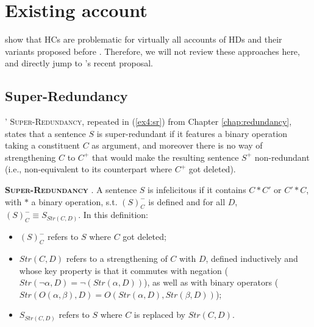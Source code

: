 \section{Existing account}\label{sec6:prev-approaches}

\textcite{Mandelkern2018} show that HCs are problematic for virtually all accounts of HDs and their variants proposed before \textcite{Kalomoiros2024}. Therefore, we will not review these approaches here, and directly jump to  \citeauthor{Kalomoiros2024}'s recent proposal.



\subsection{Super-Redundancy}
\citeauthor{Kalomoiros2024}' \textsc{Super-Redundancy}, repeated in (\ref{ex4:sr}) from Chapter \ref{chap:redundancy}, states that a sentence $S$ is super-redundant if it features a binary operation taking a constituent $C$ as argument, and moreover there is no way of strengthening $C$ to $C^+$ that would make the resulting sentence $S^+$ non-redundant (i.e., non-equivalent to its counterpart where $C^+$ got deleted).

\begin{exe}
	 {\textsc{\textbf{Super-Redundancy}} \parencite{Kalomoiros2024}. A sentence $S$ is infelicitous if it contains $C \ast C'$ or $C' \ast C$, with $\ast$ a binary operation, s.t. $(S)^-_C$ is defined and for all $D$, $(S)^-_C \equiv S_{Str(C, D)}$. In this definition:
		\begin{itemize}
			\item $(S)^-_C$ refers to $S$ where $C$ got deleted;
			\item  $Str(C, D)$ refers to a strengthening of $C$ with $D$, defined inductively and whose key property is that it commutes with negation ($Str(\neg\alpha, D) = \neg (Str(\alpha, D))$), as well as with binary operators ($Str(O(\alpha, \beta), D) = O(Str(\alpha, D), Str(\beta, D))$);
			\item $S_{Str(C, D)}$ refers to $S$ where $C$ is replaced by $Str(C, D)$.
	\end{itemize}}
\end{exe}


